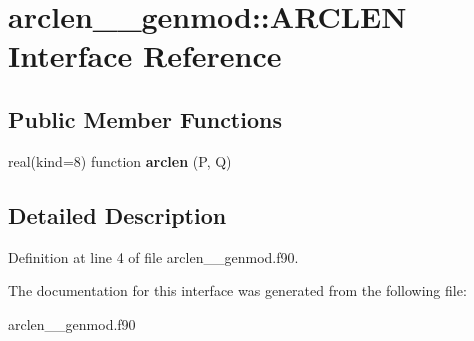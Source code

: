 \hypertarget{interfacearclen____genmod_1_1_a_r_c_l_e_n}{\section{arclen\+\_\+\+\_\+genmod\+:\+:A\+R\+C\+L\+E\+N Interface Reference}
\label{interfacearclen____genmod_1_1_a_r_c_l_e_n}
}
\subsection*{Public Member Functions}
\begin{DoxyCompactItemize}
\item 
\hypertarget{interfacearclen____genmod_1_1_a_r_c_l_e_n_a78ef2c7d0d440f9d89135b53e35b9979}{real(kind=8) function {\bfseries arclen} (P, Q)}\label{interfacearclen____genmod_1_1_a_r_c_l_e_n_a78ef2c7d0d440f9d89135b53e35b9979}

\end{DoxyCompactItemize}


\subsection{Detailed Description}


Definition at line 4 of file arclen\+\_\+\+\_\+genmod.\+f90.



The documentation for this interface was generated from the following file\+:\begin{DoxyCompactItemize}
\item 
arclen\+\_\+\+\_\+genmod.\+f90\end{DoxyCompactItemize}
